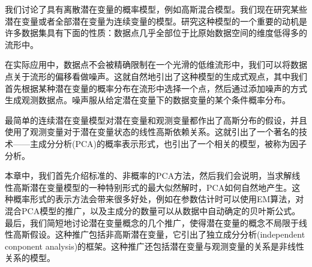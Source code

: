我们讨论了具有离散潜在变量的概率模型，例如高斯混合模型。我们现在研究某些潜在变量或者全部潜在变量为连续变量的模型。研究这种模型的一个重要的动机是许多数据集具有下面的性质：数据点几乎全部位于比原始数据空间的维度低得多的流形中。

在实际应用中，数据点不会被精确限制在一个光滑的低维流形中，我们可以将数据点关于流形的偏移看做噪声。这就自然地引出了这种模型的生成式观点，其中我们首先根据某种潜在变量的概率分布在流形中选择一个点，然后通过添加噪声的方式生成观测数据点。噪声服从给定潜在变量下的数据变量的某个条件概率分布。

最简单的连续潜在变量模型对潜在变量和观测变量都作出了高斯分布的假设，并且使用了观测变量对于潜在变量状态的线性高斯依赖关系。这就引出了一个著名的技术——主成分分析(PCA)的概率表示形式，也引出了一个相关的模型，被称为因子分析。

本章中，我们首先介绍标准的、非概率的PCA方法，然后我们会说明，当求解线性高斯潜在变量模型的一种特别形式的最大似然解时，PCA如何自然地产生。这种概率形式的表示方法会带来很多好处，例如在参数估计时可以使用EM算法，对混合PCA模型的推广，以及主成分的数量可以从数据中自动确定的贝叶斯公式。最后，我们简短地讨论潜在变量概念的几个推广，使得潜在变量的概念不局限于线性高斯假设。这种推广包括非高斯潜在变量，它引出了独立成分分析(independent conponent analysis)的框架。这种推广还包括潜在变量与观测变量的关系是非线性关系的模型。